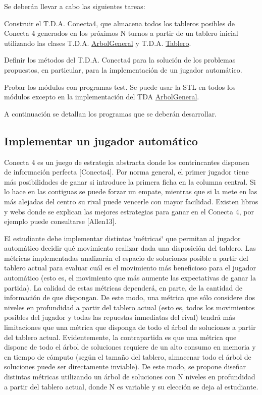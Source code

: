 Se deberán llevar a cabo las siguientes tareas\+:


\begin{DoxyEnumerate}
\item Construir el T.\+D.\+A. Conecta4, que almacena todos los tableros posibles de Conecta 4 generados en los próximos N turnos a partir de un tablero inicial utilizando las clases T.\+D.\+A. \hyperlink{classArbolGeneral}{Arbol\+General} y T.\+D.\+A. \hyperlink{classTablero}{Tablero}.
\item Definir los métodos del T.\+D.\+A. Conecta4 para la solución de los problemas propuestos, en particular, para la implementación de un jugador automático.
\item Probar los módulos con programas test. Se puede usar la S\+TL en todos los módulos excepto en la implementación del T\+DA \hyperlink{classArbolGeneral}{Arbol\+General}.
\end{DoxyEnumerate}

A continuación se detallan los programas que se deberán desarrollar.\hypertarget{index_jugador_automatico}{}\subsection{Implementar un jugador automático}\label{index_jugador_automatico}
Conecta 4 es un juego de estrategia abstracta donde los contrincantes disponen de información perfecta \mbox{[}Conecta4\mbox{]}. Por norma general, el primer jugador tiene más posibilidades de ganar si introduce la primera ficha en la columna central. Si lo hace en las contiguas se puede forzar un empate, mientras que si la mete en las más alejadas del centro su rival puede vencerle con mayor facilidad. Existen libros y webs donde se explican las mejores estrategias para ganar en el Conecta 4, por ejemplo puede consultarse \mbox{[}Allen13\mbox{]}.

El estudiante debe implementar distintas \char`\"{}métricas\char`\"{} que permitan al jugador automático decidir qué movimiento realizar dada una disposición del tablero. Las métricas implementadas analizarán el espacio de soluciones posible a partir del tablero actual para evaluar cuál es el movimiento más beneficioso para el jugador automático (esto es, el movimiento que más aumente las expectativas de ganar la partida). La calidad de estas métricas dependerá, en parte, de la cantidad de información de que dispongan. De este modo, una métrica que sólo considere dos niveles en profundidad a partir del tablero actual (esto es, todos los movimientos posibles del jugador y todas las repuestas inmediatas del rival) tendrá más limitaciones que una métrica que disponga de todo el árbol de soluciones a partir del tablero actual. Evidentemente, la contrapartida es que una métrica que dispone de todo el árbol de soluciones requiere de un alto consumo en memoria y en tiempo de cómputo (según el tamaño del tablero, almacenar todo el árbol de soluciones puede ser directamente inviable). De este modo, se propone diseñar distintas métricas utilizando un árbol de soluciones con N niveles en profundidad a partir del tablero actual, donde N es variable y su elección se deja al estudiante.

